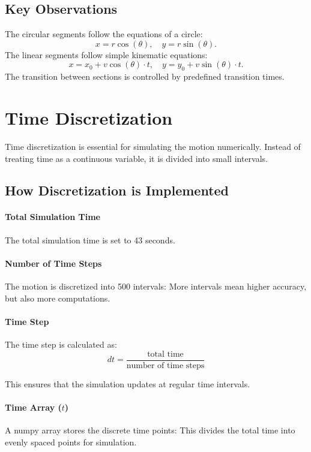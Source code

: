 \documentclass[a4paper,11pt]{article}
\begin{document}
\subsection*{Key Observations}
The circular segments follow the equations of a circle:
\begin{equation}
    x = r \cos(\theta), \quad y = r \sin(\theta).
\end{equation}
The linear segments follow simple kinematic equations:
\begin{equation}
    x = x_0 + v \cos(\theta) \cdot t, \quad y = y_0 + v \sin(\theta) \cdot t.
\end{equation}
The transition between sections is controlled by predefined transition times.

\section*{Time Discretization}
Time discretization is essential for simulating the motion numerically. Instead of treating time as a continuous variable, it is divided into small intervals.

\subsection*{How Discretization is Implemented}
\paragraph{Total Simulation Time}
The total simulation time is set to 43 seconds.

\paragraph{Number of Time Steps}
The motion is discretized into 500 intervals:
More intervals mean higher accuracy, but also more computations.

\paragraph{Time Step}
The time step is calculated as:
\begin{equation}
dt = \frac{\text{total time}}{\text{number of time steps}}
\end{equation}

This ensures that the simulation updates at regular time intervals.

\paragraph{Time Array ($t$)}
A numpy array stores the discrete time points:
This divides the total time into evenly spaced points for simulation.
\end{document}
